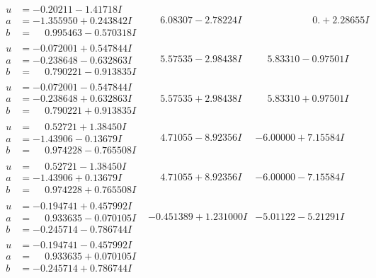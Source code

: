 \documentclass[1p]{elsarticle_modified}
\theoremstyle{definition}
\begin{document}
$$\begin{array}{c|c|c}
\begin{aligned}
u &= -0.20211 - 1.41718 I \\
a &= -1.355950 + 0.243842 I \\
b &= \phantom{-}0.995463 - 0.570318 I\end{aligned}
 & \phantom{-}6.08307 - 2.78224 I & \phantom{-0.000000 -}0. + 2.28655 I \\ \hline\begin{aligned}
u &= -0.072001 + 0.547844 I \\
a &= -0.238648 - 0.632863 I \\
b &= \phantom{-}0.790221 - 0.913835 I\end{aligned}
 & \phantom{-}5.57535 - 2.98438 I & \phantom{-}5.83310 - 0.97501 I \\ \hline\begin{aligned}
u &= -0.072001 - 0.547844 I \\
a &= -0.238648 + 0.632863 I \\
b &= \phantom{-}0.790221 + 0.913835 I\end{aligned}
 & \phantom{-}5.57535 + 2.98438 I & \phantom{-}5.83310 + 0.97501 I \\ \hline\begin{aligned}
u &= \phantom{-}0.52721 + 1.38450 I \\
a &= -1.43906 - 0.13679 I \\
b &= \phantom{-}0.974228 - 0.765508 I\end{aligned}
 & \phantom{-}4.71055 - 8.92356 I & -6.00000 + 7.15584 I \\ \hline\begin{aligned}
u &= \phantom{-}0.52721 - 1.38450 I \\
a &= -1.43906 + 0.13679 I \\
b &= \phantom{-}0.974228 + 0.765508 I\end{aligned}
 & \phantom{-}4.71055 + 8.92356 I & -6.00000 - 7.15584 I \\ \hline\begin{aligned}
u &= -0.194741 + 0.457992 I \\
a &= \phantom{-}0.933635 - 0.070105 I \\
b &= -0.245714 - 0.786744 I\end{aligned}
 & -0.451389 + 1.231000 I & -5.01122 - 5.21291 I \\ \hline\begin{aligned}
u &= -0.194741 - 0.457992 I \\
a &= \phantom{-}0.933635 + 0.070105 I \\
b &= -0.245714 + 0.786744 I\end{aligned}

\end{array}$$
\end{document}
